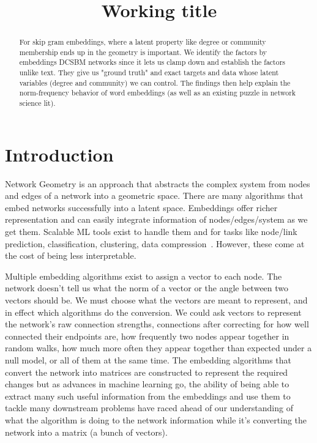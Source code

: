 \documentclass[aps,pre,reprint,superscriptaddress,longbibliography]{revtex4-2}
\begin{document}
\title{Working title}


\begin{abstract}
For skip gram embeddings, where a latent property like degree or community membership ends up in the geometry is important. 
We identify the factors by embeddings DCSBM networks since it lets us clamp down and establish the factors unlike text. 
They give us "ground truth" and exact targets and data whose latent variables (degree and community) we can control. 
The findings then help explain the norm-frequency behavior of word embeddings (as well as an existing puzzle in network science lit).

\end{abstract}

\maketitle


\section{Introduction}
\label{sec:introduction}


Network Geometry is an approach that abstracts the complex system from nodes and edges of a network into a geometric space. There are many algorithms that embed networks successfully into a latent space. %
Embeddings offer richer representation and can easily integrate information of nodes/edges/system as we get them. 
Scalable ML tools exist to handle them and for tasks like node/link prediction, classification, clustering, data compression~\cite{hamilton2017representation}.
However, these come at the cost of being less interpretable. 


Multiple embedding algorithms exist to assign a vector to each node. 
The network doesn't tell us what the norm of a vector or the angle between two vectors should be. 
We must choose what the vectors are meant to represent, and in effect which algorithms do the conversion. 
We could ask vectors to represent the network's raw connection strengths, connections after correcting for how well connected their endpoints are, how frequently two nodes appear together in random walks, how much more often they appear together than expected under a null model, or all of them at the same time. 
The embedding algorithms that convert the network into matrices are constructed to represent the required changes but as advances in machine learning go, the ability of being able to extract many such useful information from the embeddings and use them to tackle many downstream problems have raced ahead of our understanding of what the algorithm is doing to the network information while it's converting the network into a matrix (a bunch of vectors).
\end{document}
